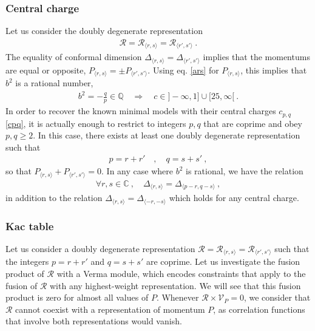 \documentclass[12pt, a4paper, notitlepage, twoside]{report}
\numberwithin{equation}{section}
\theoremstyle{break}
\begin{document}
\subsubsection{Central charge}

Let us consider the doubly degenerate representation 
\begin{align}
 \mathcal{R}=\mathcal{R}_{\langle r,s \rangle}=\mathcal{R}_{\langle r',s' \rangle}\ .
 \label{rerer}
\end{align}
The equality of conformal dimension $\Delta_{\langle r,s \rangle}=\Delta_{\langle r',s' \rangle}$ implies that 
the momentums are equal or opposite, 
$P_{\langle r,s \rangle}=\pm P_{\langle r',s' \rangle}$. Using eq. \eqref{ars} for $P_{\langle r,s\rangle}$, this implies that $b^2$ is a rational number, 
\begin{align} 
b^2=-\frac{q}{p} \in \mathbb{Q} \quad \Rightarrow \quad c\in ]-\infty, 1] \cup [25,\infty[\ .
\end{align}
In order to recover the known minimal models with their central charges $c_{p,q}$ \eqref{cpq}, it is actually enough to restrict to integers $p,q$ that are coprime and obey $p,q\geq 2$.
In this case, there exists at least one doubly degenerate representation such that 
\begin{align}
 p = r+r' \quad , \quad q = s+s'\ ,
 \label{prrp}
\end{align}
so that $P_{\langle r,s \rangle}+P_{\langle r',s' \rangle} = 0$. 
In any case where $b^2$ is rational, we have the relation
\begin{align}
 \forall r,s\in \mathbb{C}\ , \quad \Delta_{\langle r,s \rangle}=\Delta_{\langle p-r,q-s \rangle}\ ,
 \label{ddr}
\end{align}
in addition to the relation $\Delta_{\langle r,s \rangle}=\Delta_{\langle -r,-s \rangle}$ which holds for any central charge. 


\subsubsection{Kac table}

Let us consider a doubly degenerate representation $\mathcal{R}=\mathcal{R}_{\langle r,s \rangle}=\mathcal{R}_{\langle r',s' \rangle}$ such that the integers  $p=r+r'$ and $q=s+s'$ are coprime. Let us investigate the fusion product of $\mathcal{R}$ with a Verma module, which encodes constraints that apply to the fusion of $\mathcal{R}$ with 
any highest-weight representation. We will see that this fusion product is zero for almost all values of $P$. Whenever $\mathcal{R}\times \mathcal{V}_P=0$, we consider that $\mathcal{R}$ cannot coexist with a representation of momentum $P$, as correlation functions that involve both representations would vanish. 
\end{document}
